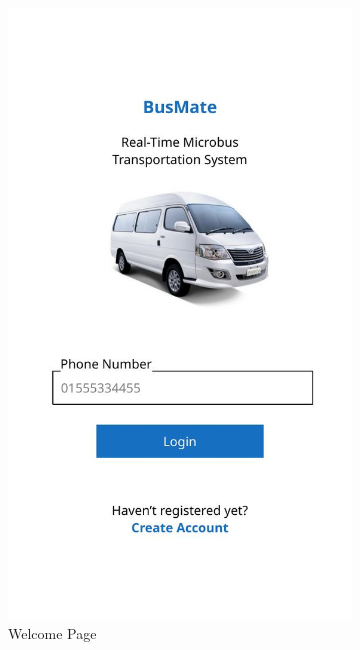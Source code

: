 \documentclass{BusMateSRS}
\begin{document}
\begin{figure}[h!]
	\centering
	\begin{subfigure}[b]{0.3\textwidth}
		\centering
		\includegraphics[width=\textwidth]{images-ui/ui-out-1.jpg}
		\caption{Welcome Page}
		\label{fig:ui1}
	\end{subfigure}
	\hfill
	\begin{subfigure}[b]{0.3\textwidth}
		\centering

\end{subfigure}
\end{figure}
\end{document}
